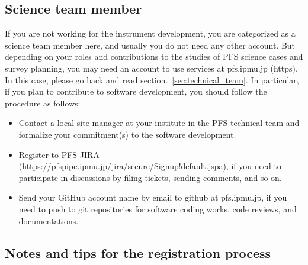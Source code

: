 \documentclass[a4paper,notitlepage]{article}
\begin{document}
\subsection{Science team member}
\label{sec:science_team}

If you are not working for the instrument development, you are categorized as 
a science team member here, and usually you do not need any other account. 
But depending on your roles and contributions to the studies of PFS science 
cases and survey planning, you may need an account to use services at 
pfs.ipmu.jp (https). 
In this case, please go back and read section.~\ref{sec:technical_team}.
In particular, if you plan to contribute to software development, 
you should follow the procedure as follows:

\begin{itemize}
  \item Contact a local site manager at your institute in the PFS technical 
    team and formalize your commitment(s) to the software development.
  \item Register to PFS JIRA 
    (\url{https://pfspipe.ipmu.jp/jira/secure/Signup!default.jspa}), 
    if you need to participate in discussions by filing tickets, sending 
    comments, and so on.
  \item Send your GitHub account name by email to github at pfs.ipmu.jp, if you 
    need to push to git repositories for software coding works, code reviews, 
    and documentations. 
\end{itemize}

\subsection{Notes and tips for the registration process}
\label{sec:account_reg_tips}
\end{document}
